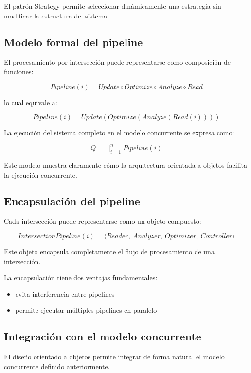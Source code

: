 \documentclass[12pt]{article}
\begin{document}
El patrón Strategy permite seleccionar dinámicamente una estrategia sin modificar la estructura del sistema.

\subsection{Modelo formal del pipeline}

El procesamiento por intersección puede representarse como composición de funciones:

\[
Pipeline(i) =
Update \circ Optimize \circ Analyze \circ Read
\]

lo cual equivale a:

\[
Pipeline(i) = Update(Optimize(Analyze(Read(i))))
\]

La ejecución del sistema completo en el modelo concurrente se expresa como:

\[
Q = \parallel_{i=1}^{n} Pipeline(i)
\]

Este modelo muestra claramente cómo la arquitectura orientada a objetos facilita la ejecución concurrente.

\subsection{Encapsulación del pipeline}

Cada intersección puede representarse como un objeto compuesto:

\[
IntersectionPipeline(i) =
\langle Reader,\ Analyzer,\ Optimizer,\ Controller \rangle
\]

Este objeto encapsula completamente el flujo de procesamiento de una intersección.

La encapsulación tiene dos ventajas fundamentales:

\begin{itemize}

\item evita interferencia entre pipelines
\item permite ejecutar múltiples pipelines en paralelo

\end{itemize}

\subsection{Integración con el modelo concurrente}

El diseño orientado a objetos permite integrar de forma natural el modelo concurrente definido anteriormente.
\end{document}
